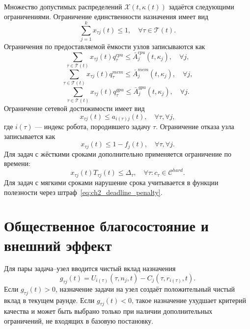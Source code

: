 Множество допустимых распределений $\mathcal{X}(t,\kappa(t))$ задаётся следующими ограничениями. Ограничение единственности назначения имеет вид
\begin{equation}
    \sum_{j=1}^{k}x_{\tau j}(t)\leq 1,\quad \forall \tau\in\mathcal{T}(t).
    \label{eq:ch2_single_assignment}
\end{equation}
Ограничения по предоставляемой ёмкости узлов записываются как
\begin{equation}
    \sum_{\tau\in\mathcal{T}(t)}x_{\tau j}(t)q^{cpu}_{\tau}\leq \bar{A}^{cpu}_j(t,\kappa_j),\quad \forall j,
    \label{eq:ch2_cpu_constraint}
\end{equation}
\begin{equation}
    \sum_{\tau\in\mathcal{T}(t)}x_{\tau j}(t)q^{mem}_{\tau}\leq \bar{A}^{mem}_j(t,\kappa_j),\quad \forall j,
    \label{eq:ch2_mem_constraint}
\end{equation}
\begin{equation}
    \sum_{\tau\in\mathcal{T}(t)}x_{\tau j}(t)q^{gpu}_{\tau}\leq \bar{A}^{gpu}_j(t,\kappa_j),\quad \forall j.
    \label{eq:ch2_gpu_constraint}
\end{equation}
Ограничение сетевой достижимости имеет вид
\begin{equation}
    x_{\tau j}(t)\leq a_{i(\tau)j}(t),\quad \forall \tau,\forall j,
    \label{eq:ch2_connectivity_constraint}
\end{equation}
где $i(\tau)$ --- индекс робота, породившего задачу $\tau$. Ограничение отказа узла записывается как
\begin{equation}
    x_{\tau j}(t)\leq 1-f_j(t),\quad \forall \tau,\forall j.
    \label{eq:ch2_failure_constraint}
\end{equation}
Для задач с жёсткими сроками дополнительно применяется ограничение по времени:
\begin{equation}
    x_{\tau j}(t)T_{\tau j}(t)\leq \Delta_{\tau},\quad \forall \tau: c_{\tau}\in\mathcal{C}^{hard}.
    \label{eq:ch2_time_constraint}
\end{equation}
Для задач с мягкими сроками нарушение срока учитывается в функции полезности через штраф~\eqref{eq:ch2_deadline_penalty}.

\section{Общественное благосостояние и внешний эффект}

Для пары задача--узел вводится чистый вклад назначения
\begin{equation}
    g_{\tau j}(t)=U_{i(\tau)}(\tau,n_j,t)-C_j(\tau,r_{i(\tau)},t).
    \label{eq:ch2_assignment_gain}
\end{equation}
Если $g_{\tau j}(t)>0$, назначение задачи на узел создаёт положительный чистый вклад в текущем раунде. Если $g_{\tau j}(t)<0$, такое назначение ухудшает критерий качества и может быть выбрано только при наличии дополнительных ограничений, не входящих в базовую постановку.

